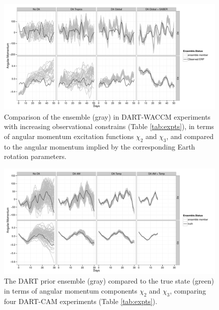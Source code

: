 \begin{figure}
	 \includegraphics[width=\textwidth]{Paper_figures/ERPDA_paper_evalvariable_aam_space.pdf}
	 \caption{Comparison of the ensemble (gray) in DART-WACCM experiments with increasing observational constrains (Table \ref{tab:expts}), in terms of angular momentum excitation functions $\chi_2$ and $\chi_3$, and compared to the angular momentum implied by the corresponding Earth rotation parameters.}
	 \label{fig:evalvariable_aam}
\end{figure}

\begin{figure}[p]
\includegraphics[width=\textwidth]{Paper_figures/ERPDA_paper_erpda_obs_space.pdf} 
\caption{ The DART prior ensemble (gray) compared to the true state (green) in terms of angular momentum components $\chi_2$ and $\chi_3$, comparing four DART-CAM experiments (Table \ref{tab:expts}).  }
 \label{fig:fit_to_ERPs}
\end{figure}

